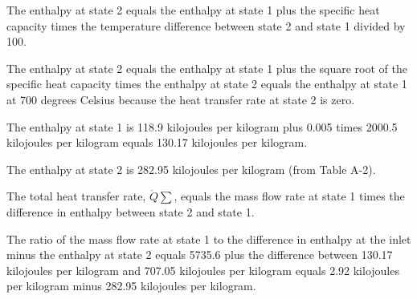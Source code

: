 The enthalpy at state 2 equals the enthalpy at state 1 plus the specific heat capacity times the temperature difference between state 2 and state 1 divided by 100.

The enthalpy at state 2 equals the enthalpy at state 1 plus the square root of the specific heat capacity times the enthalpy at state 2 equals the enthalpy at state 1 at 700 degrees Celsius because the heat transfer rate at state 2 is zero.

The enthalpy at state 1 is 118.9 kilojoules per kilogram plus 0.005 times 2000.5 kilojoules per kilogram equals 130.17 kilojoules per kilogram.

The enthalpy at state 2 is 282.95 kilojoules per kilogram (from Table A-2).

The total heat transfer rate, $\dot{Q} \sum$, equals the mass flow rate at state 1 times the difference in enthalpy between state 2 and state 1.

The ratio of the mass flow rate at state 1 to the difference in enthalpy at the inlet minus the enthalpy at state 2 equals 5735.6 plus the difference between 130.17 kilojoules per kilogram and 707.05 kilojoules per kilogram equals 2.92 kilojoules per kilogram minus 282.95 kilojoules per kilogram.